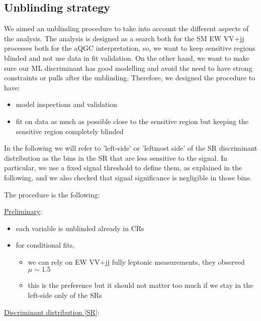 \subsection{Unblinding strategy}
\label{sec:fit_unbliding_str}

We aimed an unblinding procedure to take into account the different aspects of the analysis.
The analysis is designed as a search both for the SM EW VV+jj processes both for the aQGC interpretation, 
so, we want to keep sensitive regions blinded and not use data in fit validation.
On the other hand, we want to make sure our ML discriminant has good modelling and avoid the need to have strong constraints or pulls after the unblinding.
Therefore, we designed the procedure to have:

\begin{itemize}
  \item model inspections and validation
  \item fit on data as much as possible close to the sensitive region but keeping the sensitive region completely blinded
\end{itemize}

In the following we will refer to 'left-side' or 'leftmost side' of the SR discriminant distribution 
as the bins in the SR that are less sensitive to the signal. In particular, we use a fixed signal threshold 
to define them, as explained in the following, and we also checked that signal significance is negligible
in those bins.

The procedure is the following:

\underline{Preliminary}:

\begin{itemize}
\item each variable is unblinded already in CRs
\item for conditional fits, 
  \begin{itemize}
    \item we can rely on EW VV+jj fully leptonic measurements, they observed $\mu \sim 1.5$
    \item this is the preference but it should not matter too much if we stay in the left-side only of the SRs
  \end{itemize}
\end{itemize}
  
\underline{Discriminant distribution [SR]}:

